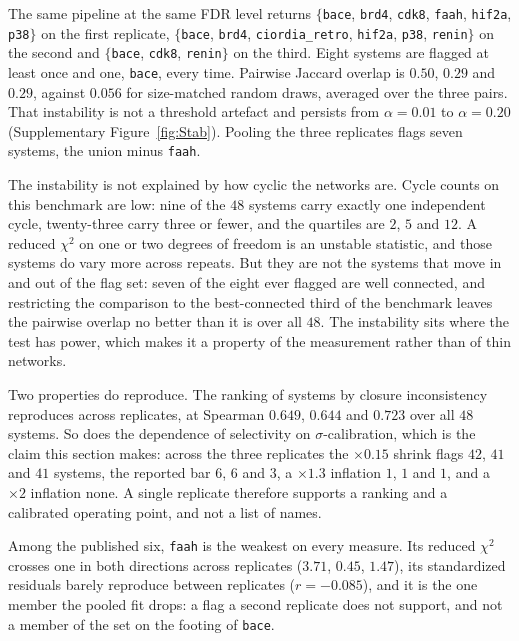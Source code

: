The same pipeline at the same FDR level returns
$\{$\texttt{bace}, \texttt{brd4}, \texttt{cdk8}, \texttt{faah}, \texttt{hif2a}, \texttt{p38}$\}$ on
the first replicate, $\{$\texttt{bace}, \texttt{brd4}, \texttt{ciordia\_retro}, \texttt{hif2a},
\texttt{p38}, \texttt{renin}$\}$ on the second and $\{$\texttt{bace}, \texttt{cdk8},
\texttt{renin}$\}$ on the third. Eight systems are flagged at least once and one,
\texttt{bace}, every time. Pairwise Jaccard overlap is $0.50$, $0.29$ and $0.29$, against
$0.056$ for size-matched random draws, averaged over the three pairs. That instability is
not a threshold artefact and persists from $\alpha=0.01$ to $\alpha=0.20$ (Supplementary Figure~\ref{fig:Stab}). Pooling the
three replicates flags seven systems, the union minus \texttt{faah}.

The instability is not explained by how cyclic the networks are. Cycle counts on this benchmark are
low: nine of the $48$ systems carry exactly one independent cycle, twenty-three carry three or
fewer, and the quartiles are $2$, $5$ and $12$. A reduced $\chi^2$ on one or two degrees of freedom
is an unstable statistic, and those systems do vary more across repeats. But they are not the
systems that move in and out of the flag set: seven of the eight ever flagged are well connected,
and restricting the comparison to the best-connected third of the benchmark leaves the pairwise
overlap no better than it is over all $48$. The instability sits where the test has power, which
makes it a property of the measurement rather than of thin networks.

Two properties do reproduce. The ranking of systems by closure inconsistency reproduces across
replicates, at Spearman $0.649$, $0.644$ and $0.723$ over all $48$ systems. So does the dependence
of selectivity on $\sigma$-calibration, which is the claim this section makes: across the three
replicates the $\times0.15$ shrink flags $42$, $41$ and $41$ systems, the reported bar $6$, $6$
and $3$, a $\times1.3$ inflation $1$, $1$ and $1$, and a $\times2$ inflation none. A single replicate therefore supports a ranking and a calibrated operating point, and
not a list of names.

Among the published six, \texttt{faah} is the weakest on every measure. Its reduced $\chi^2$
crosses one in both directions across replicates ($3.71$, $0.45$, $1.47$), its standardized
residuals barely reproduce between replicates ($r=-0.085$), and it is the one member the pooled fit
drops: a flag a second replicate does not support, and not a member of the set on the footing of
\texttt{bace}.


